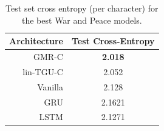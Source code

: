 \begin{table}
\centering
\begin{tabu} to \textwidth {r||c}
Architecture & Test Cross-Entropy \\
\hline
GMR-C & \textbf{2.018} \\ %
lin-TGU-C & 2.052 \\ %
\hline
Vanilla & 2.128 \\ %
GRU & 2.1621 \\ %
LSTM & 2.1271 \\%
\hline
\end{tabu}
\caption{Test set cross entropy (per character) for the best War and Peace models.}
\label{tab:wptest}
\end{table}
